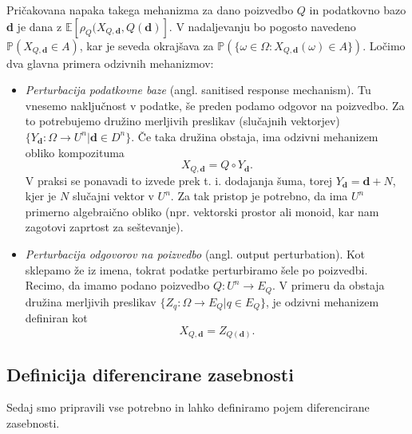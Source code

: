 \documentclass[12pt,a4paper]{amsart}
\theoremstyle{definition} %
\theoremstyle{plain} %
\begin{document}
Pričakovana napaka takega mehanizma za dano poizvedbo $Q$ in podatkovno bazo \textbf{d} je dana z $\mathbb{E}[\rho_{Q}(X_{Q,\textbf{d}},Q(\textbf{d})]$. 
V nadaljevanju bo pogosto navedeno $\mathbb{P}(X_{Q,\textbf{d}} \in A)$, kar je seveda okrajšava za $\mathbb{P}(\{\omega \in \Omega : X_{Q,\textbf{d}}(\omega) \in A \})$.
\newline
\newline
Ločimo dva glavna primera odzivnih mehanizmov:
\begin{itemize}
\item \textit{Perturbacija podatkovne baze} (angl. sanitised response mechanism). Tu vnesemo naključnost v podatke, še preden podamo odgovor na poizvedbo. Za to potrebujemo družino merljivih preslikav (slučajnih vektorjev) $\{ Y_{\textbf{d}}: \Omega \rightarrow U^n | \textbf{d} \in D^n\}$. Če taka družina obstaja, ima odzivni mehanizem obliko kompozituma
\begin{equation}\label{odzivni2}
 X_{Q,\textbf{d}} = Q \circ Y_{\textbf{d}}. \tag{2}
\end{equation} 
V praksi se ponavadi to izvede prek t. i. dodajanja šuma, torej $Y_{\textbf{d}} = \textbf{d}+N$, kjer je $N$ slučajni vektor v $U^n$. Za tak pristop je potrebno, da ima $U^n$ primerno algebraično obliko (npr. vektorski prostor ali monoid, kar nam zagotovi zaprtost za seštevanje).
\item \textit{Perturbacija odgovorov na poizvedbo} (angl. output perturbation). Kot sklepamo že iz imena, tokrat podatke perturbiramo šele po poizvedbi. Recimo, da imamo podano poizvedbo $Q: U^n \rightarrow E_{Q}$. V primeru da obstaja družina merljivih preslikav $ \{Z_{q}:\Omega \rightarrow E_{Q} | q  \in E_{Q} \}$, je odzivni mehanizem definiran kot
\begin{equation}\label{odzivni3}
X_{Q,\textbf{d}}=Z_{Q(\textbf{d})}.\tag{3}
\end{equation} 
\end{itemize}

\subsection{Definicija diferencirane zasebnosti}
Sedaj smo pripravili vse potrebno in lahko definiramo pojem diferencirane zasebnosti.
\end{document}
